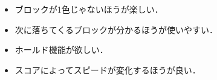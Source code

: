 \begin{itemize}
  \item ブロックが1色じゃないほうが楽しい．
  \item 次に落ちてくるブロックが分かるほうが使いやすい．
  \item ホールド機能が欲しい．
  \item スコアによってスピードが変化するほうが良い．
\end{itemize}
